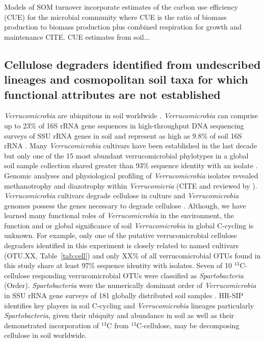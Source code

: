 Models of SOM turnover incorporate estimates of the carbon use efficiency
(CUE) for the microbial community where CUE is the ratio of biomass
production to biomass production plus combined respiration for growth and
maintenance CITE.  CUE estimates from soil... 

\subsection{Cellulose degraders identified from undescribed lineages and
    cosmopolitan soil taxa for which functional attributes are not established}
\textit{Verrucomicrobia} are ubiquitous in soil worldwide
\citep{Bergmann_2011}.  \textit{Verrucomicrobia} can comprise up to 23\%
of 16S rRNA gene sequences in high-throughput DNA sequencing surveys of
SSU rRNA genes in soil \citep{Bergmann_2011} and represent as high as
9.8\% of soil 16S rRNA \citep{Buckley_2001}. Many \textit{Verrucomicrobia}
cultivars have been established in the last decade \cite{Wertz_2011} but
only one of the 15 most abundant verrucomicrobial phylotypes in a global
soil sample collection shared greater than 93\% sequence identity with an
isolate \citep{Bergmann_2011}. Genomic analyses and physiological
profiling of \textit{Verrucomicrobia} isolates revealed methanotrophy and
diazotrophy \citep{Wertz_2011} within \textit{Verrucomicria} (CITE and
reviewed by \citet{Wertz_2011}). \textit{Verrucomicrobia} cultivars
degrade cellulose in culture and \textit{Verrucomicrobia} genomes possess
the genes necessary to degrade cellulose \citep{Otsuka_2012, Wertz_2011}.
Although, we have learned many functional roles of
\textit{Verrucomicrobia} in the environment, the function and or global
significance of soil \textit{Verrucomicrobia} in global C-cycling is
unknown. For example, only one of the putative verrucomicrobial cellulose
degraders identified in this experiment is closely related to named
cultivars (OTU.XX, Table~\ref{tab:cell}) and only XX\% of all
verrucomicrobial OTUs found in this study share at least 97\% sequence
identity with isolates. Seven of 10 $^{13}$C-cellulose responding
verrucomicrobial OTUs were classified as \textit{Spartobacteria} (Order).
\textit{Spartobacteria} were the numerically dominant order
of \textit{Verrucomicrobia} in SSU rRNA gene surveys of 181 globally
distributed soil samples \citep{Bergmann_2011}. HR-SIP identifies key
players in soil C-cycling and \textit{Verrucomicrobia} lineages
particularly \textit{Spartobacteria}, given their ubiquity and abundance
in soil as well as their demonstrated incorporation of $^{13}$C from
$^{13}$C-cellulose, may be decomposing cellulose in soil worldwide. 


